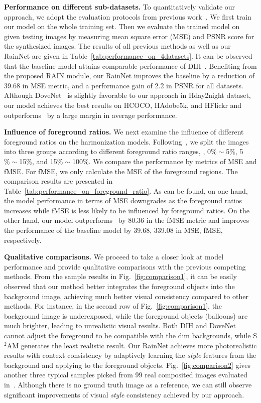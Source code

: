 \documentclass[final]{cvpr}
\begin{document}
\noindent
\textbf{Performance on different sub-datasets.} To quantitatively validate our approach, we adopt the evaluation protocols from previous work~\cite{cong2020dovenet,tsai2017deep,cun2020improving}. We first train our model on the whole training set. Then we evaluate the trained model on given testing images by measuring mean square error (MSE) and PSNR score for the synthesized images. The results of all previous methods as well as our RainNet are given in Table~\ref{tab:performance_on_4datasets}. It can be observed that the baseline model attains comparable performance of DIH~\cite{tsai2017deep}. Benefiting from the proposed RAIN module, our RainNet improves the baseline by a reduction of 39.68 in MSE metric, and a performance gain of 2.2 in PSNR for all datasets. Although DoveNet~\cite{cong2020dovenet} is slightly favorable to our approach in Hday2night dataset, our model achieves the best results on HCOCO, HAdobe5k, and HFlickr and outperforms~\cite{cong2020dovenet} by a large margin in average performance. 


\noindent
\textbf{Influence of foreground ratios.} We next examine the influence of different foreground ratios on the harmonization models. Following~\cite{cong2020dovenet}, we split the images into three groups according to different foreground ratio ranges, \ie, 0$\%\sim$5$\%$, 5$\%\sim$15$\%$, and 15$\%\sim$100$\%$. We compare the performance by metrics of MSE and fMSE. For fMSE, we only calculate the MSE of the foreground regions. The comparison results are presented in Table~\ref{tab:performance_on_foreground_ratio}. As can be found, on one hand, the model performance in terms of MSE downgrades as the foreground ratios increases while fMSE is less likely to be influenced by foreground ratios. On the other hand, our model outperforms~\cite{cong2020dovenet} by 80.36 in the fMSE metric and improves the performance of the baseline model by 39.68, 339.08 in MSE, fMSE, respectively. 


\noindent
\textbf{Qualitative comparisons.} We proceed to take a closer look at model performance and provide qualitative comparisons with the previous competing methods. From the sample results in Fig.~\ref{fig:comparison1}, it can be easily observed that our method better integrates the foreground objects into the background image, achieving much better visual consistency compared to other methods. For instance, in the second row of Fig.~\ref{fig:comparison1}, the background image is underexposed, while the foreground objects (balloons) are much brighter, leading to unrealistic visual results. Both DIH and DoveNet cannot adjust the foreground to be compatible with the dim backgrounds, while S$^2$AM generates the least realistic result. Our RainNet achieves more photorealistic results with context consistency by adaptively learning the \emph{style} features from the background and applying to the foreground objects. Fig.~\ref{fig:comparison2} gives another three typical samples picked from 99 real composited images evaluated in~\cite{tsai2017deep}. Although there is no ground truth image as a reference, we can still observe significant improvements of visual \emph{style} consistency achieved by our approach. 
\end{document}
